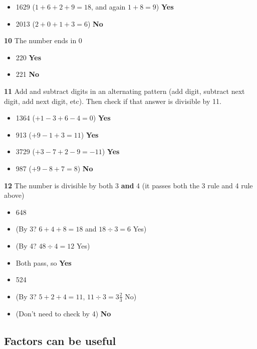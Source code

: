\begin{itemize}
  \item 1629 ($1+6+2+9=18$, and again $1+8=9$) \textbf{Yes}
  \item 2013 ($2+0+1+3=6$) \textbf{No}
\end{itemize}

\textbf{10} The number ends in 0

\begin{itemize}
  \item 220 \textbf{Yes}
  \item 221 \textbf{No}
\end{itemize}

\textbf{11} Add and subtract digits in an alternating pattern (add digit, subtract next digit, add next digit, etc). Then check if that answer is divisible by 11.

\begin{itemize}
  \item 1364 ($+1-3+6-4=0$) \textbf{Yes}
  \item 913 ($+9-1+3=11$) \textbf{Yes}
  \item 3729 ($+3-7+2-9=-11$) \textbf{Yes}
  \item 987 ($+9-8+7=8$) \textbf{No}
\end{itemize}

\vspace{7 mm}

\textbf{12} The number is divisible by both 3 \textbf{and} 4 (it passes both the 3 rule and 4 rule above)

\begin{itemize}
  \item 648
  \item (By 3? $6+4+8=18$ and $18\div 3=6$ Yes)
  \item (By 4? $48\div 4=12$ Yes)
  \item Both pass, so \textbf{Yes}
\end{itemize}

\begin{itemize}
  \item 524
  \item (By 3? $5+2+4=11$, $11\div 3=3\frac{2}{3}$ No)
  \item (Don't need to check by 4) \textbf{No}
\end{itemize}

\subsection{Factors can be useful}


